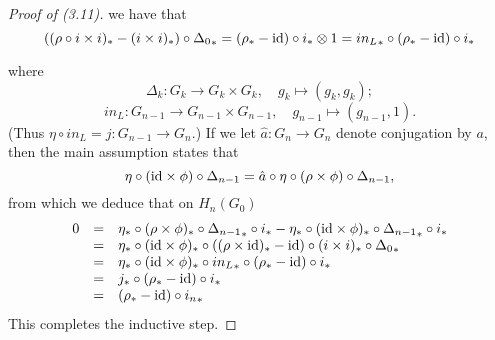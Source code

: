 \begin{proof}[Proof of (3.11)]
we have that
\[((\rho \circ i\times i)_*-(i\times i)_*)\circ {\Delta_0}_*=(\rho_*-\mathrm{id})\circ i_* \otimes 1 = {in_{L}}_* \circ (\rho_*-\mathrm{id})\circ i_*\]

where
\[\Delta_k \colon   G_k \longrightarrow G_k \times G_k, \quad g_k \mapsto (g_k,g_k);\]
\[in_L\colon  G_{n-1}\longrightarrow G_{n-1} \times G_{n-1},\quad  g_{n-1} \mapsto (g_{n-1},1).\]
(Thus $\eta\circ in_L=j\colon   G_{n-1}\longrightarrow G_n$.)
If we let $\hat{a}\colon   G_n\longrightarrow G_n$ denote conjugation by $a$, then the main assumption states that 
\[\eta \circ (\mathrm{id} \times \phi)\circ \Delta_{n-1} =\hat{a} \circ \eta \circ (\rho\times \phi)\circ \Delta_{n-1},\]
from which we deduce that on $H_n(G_0)$
\[\begin{array}{ccl}
0 & =& \eta_* \circ (\rho \times \phi)_* \circ {\Delta_{n-1}}_* \circ i_*-\eta_* \circ (\mathrm{id} \times \phi)_* \circ {\Delta_{n-1}}_*\circ i_* \\
 & =&\eta_* \circ (\mathrm{id} \times \phi)_* \circ ((\rho \times \mathrm{id})_* -\mathrm{id}) \circ (i\times i)_* \circ {\Delta_0}_* \\
 & =&\eta_* \circ (\mathrm{id} \times \phi)_* \circ {in_L}_* \circ (\rho_* -\mathrm{id}) \circ i_* \\
 & =& j_*\circ (\rho_* -\mathrm{id}) \circ i_* \\
 & =&(\rho_* -\mathrm{id}) \circ {i_n}_*
\end{array}
\]
This completes the inductive step.
\end{proof}